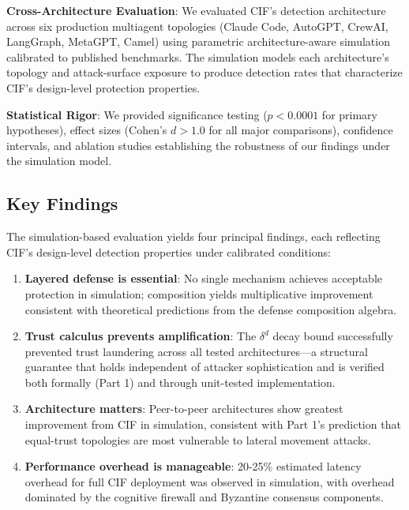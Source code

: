 \documentclass[
]{article}
\begin{document}
\textbf{Cross-Architecture Evaluation}: We evaluated CIF's detection
architecture across six production multiagent topologies (Claude Code,
AutoGPT, CrewAI, LangGraph, MetaGPT, Camel) using parametric
architecture-aware simulation calibrated to published benchmarks. The
simulation models each architecture's topology and attack-surface
exposure to produce detection rates that characterize CIF's design-level
protection properties.

\textbf{Statistical Rigor}: We provided significance testing
(\(p < 0.0001\) for primary hypotheses), effect sizes (Cohen's
\(d > 1.0\) for all major comparisons), confidence intervals, and
ablation studies establishing the robustness of our findings under the
simulation model.

\subsection{Key Findings}\label{key-findings}

The simulation-based evaluation yields four principal findings, each
reflecting CIF's design-level detection properties under calibrated
conditions:

\begin{enumerate}
\def\labelenumi{\arabic{enumi}.}
\item
  \textbf{Layered defense is essential}: No single mechanism achieves
  acceptable protection in simulation; composition yields multiplicative
  improvement consistent with theoretical predictions from the defense
  composition algebra.
\item
  \textbf{Trust calculus prevents amplification}: The \(\delta^d\) decay
  bound successfully prevented trust laundering across all tested
  architectures---a structural guarantee that holds independent of
  attacker sophistication and is verified both formally (Part 1) and
  through unit-tested implementation.
\item
  \textbf{Architecture matters}: Peer-to-peer architectures show
  greatest improvement from CIF in simulation, consistent with Part 1's
  prediction that equal-trust topologies are most vulnerable to lateral
  movement attacks.
\item
  \textbf{Performance overhead is manageable}: 20-25\% estimated latency
  overhead for full CIF deployment was observed in simulation, with
  overhead dominated by the cognitive firewall and Byzantine consensus
  components.
\end{enumerate}
\end{document}
